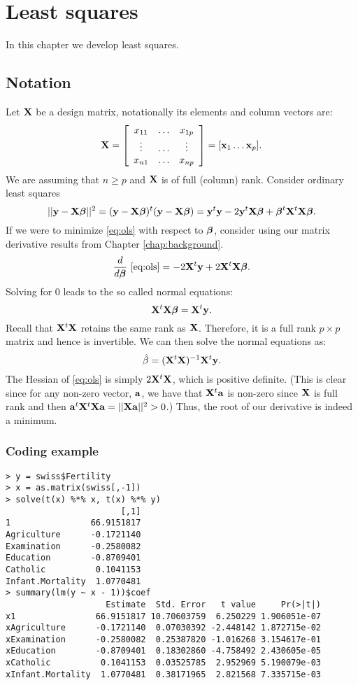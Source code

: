 \chapter{Least squares}

In this chapter we develop least squares. 

\section{Notation}
Let $\mathbf{X}$ be a design matrix, notationally its
elements and column vectors are:
$$
\mathbf{X} =
\left[
\begin{array}{ccc}
x_{11} & \ldots & x_{1p}  \\
\vdots & \ldots & \vdots \\
x_{n1} & \ldots & x_{np}
\end{array}
\right]
= [\mathbf{x}_1 \ldots \mathbf{x}_p].
$$
We are assuming that $n \geq p$ and $\mathbf{X}$ is of full (column) rank. 
Consider ordinary least squares
\begin{equation}
\label{eq:ols}
|| \mathbf{y} - \mathbf{X} \boldsymbol{\beta} ||^2 = (\mathbf{y} - \mathbf{X} \boldsymbol{\beta})^t (\mathbf{y} - \mathbf{X} \boldsymbol{\beta})
= \mathbf{y}^t \mathbf{y} - 2 \mathbf{y}^t \mathbf{X} \boldsymbol{\beta} + \boldsymbol{\beta}^t \mathbf{X}^t \mathbf{X} \boldsymbol{\beta}.
\end{equation}
If we were to minimize \eqref{eq:ols} with respect to $\boldsymbol{\beta}$,
consider using our matrix derivative results from Chapter \ref{chap:background}.
$$
\frac{d}{d\boldsymbol{\beta}}~\eqref{eq:ols}
= -2 \mathbf{X}^t \mathbf{y} + 2 \mathbf{X}^t \mathbf{X} \boldsymbol{\beta}.
$$
Solving for $0$ leads to the so called normal equations:
$$\mathbf{X}^t \mathbf{X} \boldsymbol{\beta} = \mathbf{X}^t \mathbf{y}.$$
Recall that $\mathbf{X}^t \mathbf{X}$ retains the same rank as $\mathbf{X}$. Therefore,
it is a full rank $p\times p$ matrix and hence is invertible. We
can then solve the normal equations as:
\begin{equation}
\label{eq:betahat}
\hat \beta = (\mathbf{X}^t \mathbf{X})^{-1} \mathbf{X}^t \mathbf{y}.
\end{equation}
The Hessian of \eqref{eq:ols} is simply $2\mathbf{X}^t \mathbf{X}$, which is positive
definite. (This is clear since for any non-zero vector, $\mathbf{a}$, we have that
$\mathbf{X}^t \mathbf{a}$ is non-zero since $\mathbf{X}$ is full rank and then
$\mathbf{a}^t \mathbf{X}^t \mathbf{X} \mathbf{a} = ||\mathbf{X} \mathbf{a}||^2 > 0$.) Thus, the root of
our derivative is indeed a minimum. 

\subsection{Coding example}
\begin{verbatim}
> y = swiss$Fertility
> x = as.matrix(swiss[,-1])
> solve(t(x) %*% x, t(x) %*% y)
                       [,1]
1                66.9151817
Agriculture      -0.1721140
Examination      -0.2580082
Education        -0.8709401
Catholic          0.1041153
Infant.Mortality  1.0770481
> summary(lm(y ~ x - 1))$coef
                    Estimate  Std. Error   t value     Pr(>|t|)
x1                66.9151817 10.70603759  6.250229 1.906051e-07
xAgriculture      -0.1721140  0.07030392 -2.448142 1.872715e-02
xExamination      -0.2580082  0.25387820 -1.016268 3.154617e-01
xEducation        -0.8709401  0.18302860 -4.758492 2.430605e-05
xCatholic          0.1041153  0.03525785  2.952969 5.190079e-03
xInfant.Mortality  1.0770481  0.38171965  2.821568 7.335715e-03
\end{verbatim}

